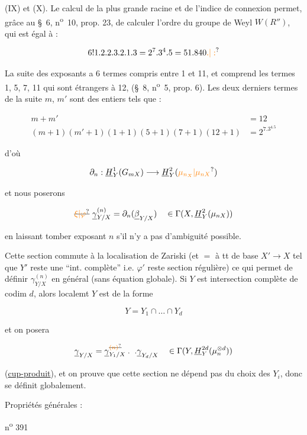 (IX) et (X). Le calcul de la plus grande racine et de l'indice de connexion permet, grâce au \S~6, n\textsuperscript{o}~10, prop. 23, de calculer l'ordre du groupe de Weyl $W(R'')$, qui est égal à :

\[
6!1.2.2.3.2.1.3=2^7.3^4.5=51.840\unsure{.|:}
\]

La suite des exposants a 6 termes compris entre 1 et 11, et comprend les termes 1, 5, 7, 11 qui sont étrangers à 12, (\S~8, n\textsuperscript{o}~5, prop. 6). Les deux derniers termes de la suite $m$, $m'$ sont des entiers tels que :

\[
\begin{aligned}
m+m'&=12\\
(m+1)(m'+1)(1+1)(5+1)(7+1)(12+1)&=2^7.3^4.5
\end{aligned}
\]

d'où

\[
\partial_n:\underline H^1_Y(G_{mX})\longrightarrow\underline H^2_Y(\unsure{\mu_{n_X}|\mu_{nX}})
\]

et nous poserons

\[
\deleted{\unsure{\xi|\varphi}}\ \underline\gamma^{(n)}_{Y/X}=\partial_n(\underline\beta_{Y/X})\quad\in\Gamma(X,\underline H^2_Y(\mu_{nX}))
\]

en laissant tomber  exposant $n$ s'il n'y a pas d'ambiguité possible.

 Cette section  commute à la localisation de Zariski (et $=$ à tt  de base $X'\longrightarrow X$ tel que $Y'$ reste une ``int. complète'' i.e. $\varphi'$ reste section régulière) ce qui permet de définir $\gamma^{(n)}_{Y/X}$ en général (sans équation globale). Si  $Y$ est intersection complète de codim $d$, alors localemt $Y$ est de la forme

\[
Y=Y_1\cap\ldots\cap Y_d
\]

et on posera

\[
\underline\gamma_{Y/X}=\underline\gamma^{\deleted{\unsure{(n)}}}_{Y_1/X}\mathbin{.}\ \mathbin{.}\underline\gamma_{Y_d/X}\quad\in\Gamma(Y,\underline H^{2d}_Y(\mu_n^{\otimes d}))
\]

(\uline{cup-produit}), et on prouve que cette section ne dépend pas du choix des $Y_i$, donc se définit globalement.

Propriétés générales :

\hfill n\textsuperscript{o} 391

